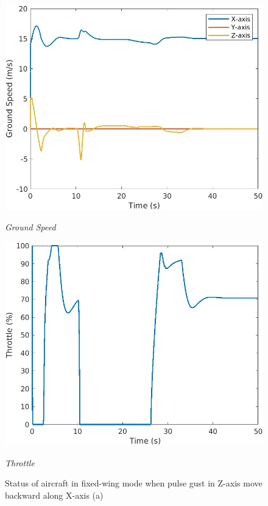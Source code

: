 \begin{figure}[htbp]
  \begin{minipage}[b]{0.45\textwidth}
    \centering
    \includegraphics[width=\textwidth]{Images/Control Surface Analysis/3 groundspeed_1.jpg}
    \caption*{\textit{Ground Speed}}
  \end{minipage}
  \hfil
  \begin{minipage}[b]{0.45\textwidth}
    \centering
    \includegraphics[width=\textwidth]{Images/Control Surface Analysis/5 Throttle_1.jpg}
    \caption*{\textit{Throttle}}
  \end{minipage}
  \caption{Status of aircraft in fixed-wing mode when pulse gust in Z-axis move backward along X-axis (a)}
  \label{fig:Control Surface Analysis 1}
\end{figure}

